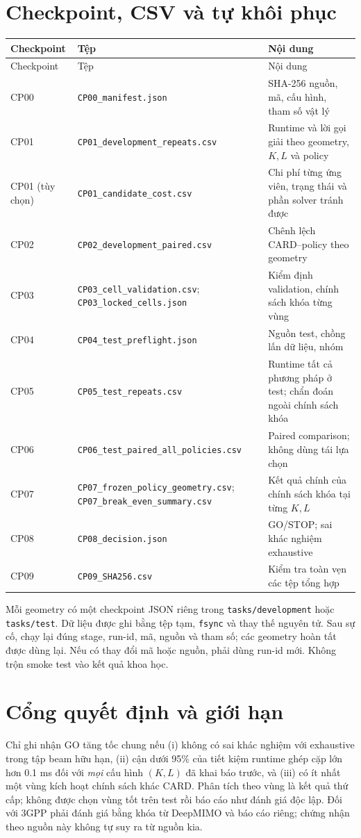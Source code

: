 \documentclass[11pt,onecolumn]{IEEEtran}
\begin{document}
\section{Checkpoint, CSV và tự khôi phục}
\begingroup\footnotesize
\begin{longtable}{p{.10\linewidth}p{.37\linewidth}p{.40\linewidth}}
\toprule Checkpoint & Tệp & Nội dung\\\midrule\endfirsthead
\toprule Checkpoint & Tệp & Nội dung\\\midrule\endhead
CP00 & \texttt{CP00\_manifest.json} & SHA-256 nguồn, mã, cấu hình, tham số vật lý\\
CP01 & \texttt{CP01\_development\_repeats.csv} & Runtime và lời gọi giải theo geometry, $K,L$ và policy\\
CP01 (tùy chọn) & \texttt{CP01\_candidate\_cost.csv} & Chi phí từng ứng viên, trạng thái và phần solver tránh được\\
CP02 & \texttt{CP02\_development\_paired.csv} & Chênh lệch CARD--policy theo geometry\\
CP03 & \texttt{CP03\_cell\_validation.csv}; \texttt{CP03\_locked\_cells.json} & Kiểm định validation, chính sách khóa từng vùng\\
CP04 & \texttt{CP04\_test\_preflight.json} & Nguồn test, chồng lấn dữ liệu, nhóm\\
CP05 & \texttt{CP05\_test\_repeats.csv} & Runtime tất cả phương pháp ở test; chẩn đoán ngoài chính sách khóa\\
CP06 & \texttt{CP06\_test\_paired\_all\_policies.csv} & Paired comparison; không dùng tái lựa chọn\\
CP07 & \texttt{CP07\_frozen\_policy\_geometry.csv}; \texttt{CP07\_break\_even\_summary.csv} & Kết quả chính của chính sách khóa tại từng $K,L$\\
CP08 & \texttt{CP08\_decision.json} & GO/STOP; sai khác nghiệm exhaustive\\
CP09 & \texttt{CP09\_SHA256.csv} & Kiểm tra toàn vẹn các tệp tổng hợp\\\bottomrule
\end{longtable}
\endgroup
Mỗi geometry có một checkpoint JSON riêng trong \texttt{tasks/development} hoặc \texttt{tasks/test}. Dữ liệu được ghi bằng tệp tạm, \texttt{fsync} và thay thế nguyên tử. Sau sự cố, chạy lại đúng stage, run-id, mã, nguồn và tham số; các geometry hoàn tất được dùng lại. Nếu có thay đổi mã hoặc nguồn, phải dùng run-id mới. Không trộn smoke test vào kết quả khoa học.

\section{Cổng quyết định và giới hạn}
Chỉ ghi nhận GO tăng tốc chung nếu (i) không có sai khác nghiệm với exhaustive trong tập beam hữu hạn, (ii) cận dưới 95\% của tiết kiệm runtime ghép cặp lớn hơn 0.1 ms đối với \emph{mọi} cấu hình $(K,L)$ đã khai báo trước, và (iii) có ít nhất một vùng kích hoạt chính sách khác CARD. Phân tích theo vùng là kết quả thứ cấp; không được chọn vùng tốt trên test rồi báo cáo như đánh giá độc lập. Đối với 3GPP phải đánh giá bằng khóa từ DeepMIMO và báo cáo riêng; chứng nhận theo nguồn này không tự suy ra từ nguồn kia.
\end{document}
